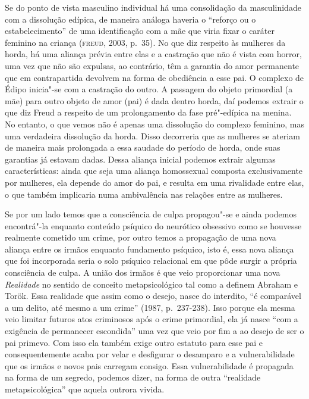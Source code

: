 Se do ponto de vista masculino individual há uma consolidação da
masculinidade com a dissolução edípica, de maneira análoga haveria o
``reforço ou o estabelecimento'' de uma identificação com a mãe que
viria fixar o caráter feminino na criança (\textsc{freud}, 2003, p.~35). No
que diz respeito às mulheres da horda, há uma aliança prévia entre elas
e a castração que não é vista com horror, uma vez que não são expulsas, ao
contrário, têm a garantia do amor permanente que em contrapartida
devolvem na forma de obediência a esse pai. O complexo de Édipo
inicia"-se com a castração do outro. A passagem do objeto primordial (a
mãe) para outro objeto de amor (pai) é dada dentro horda, daí podemos
extrair o que diz Freud a respeito de um prolongamento da fase
pré"-edípica na menina. No entanto, o que vemos não é apenas uma
dissolução do complexo feminino, mas uma verdadeira dissolução da horda.
Disso decorreria que as mulheres se ateriam de maneira mais prolongada a
essa saudade do período de horda, onde suas garantias já estavam dadas.
Dessa aliança inicial podemos extrair algumas características: ainda que
seja uma aliança homossexual composta exclusivamente por mulheres, ela
depende do amor do pai, e resulta em uma rivalidade entre elas, o
que também implicaria numa ambivalência nas relações entre as mulheres.

Se por um lado temos que a consciência de culpa propagou"-se e ainda
podemos encontrá"-la enquanto conteúdo psíquico do neurótico obsessivo
como se houvesse realmente cometido um crime, por outro temos a
propagação de uma nova aliança entre os irmãos enquanto fundamento
psíquico, isto é, essa nova aliança que foi incorporada seria o solo
psíquico relacional em que pôde surgir a própria consciência de culpa. A
união dos irmãos é que veio proporcionar uma nova \emph{Realidade} no
sentido de conceito metapsicológico tal como a definem Abraham e Torök.
Essa realidade que assim como o
desejo, nasce do interdito, ``é comparável a um delito, até mesmo a um
crime'' (1987, p.~237-238). Isso porque ela mesma veio limitar futuros
atos criminosos após o crime primordial, ela já nasce ``com a exigência
de permanecer escondida'' uma vez que veio por fim a ao desejo de ser o
pai primevo. Com isso ela também exige outro estatuto para esse pai e
consequentemente acaba por velar e desfigurar o desamparo e a
vulnerabilidade que os irmãos e novos pais carregam consigo. Essa
vulnerabilidade é propagada na forma de um segredo, podemos dizer, na
forma de outra ``realidade metapsicológica'' que aquela outrora vivida.


